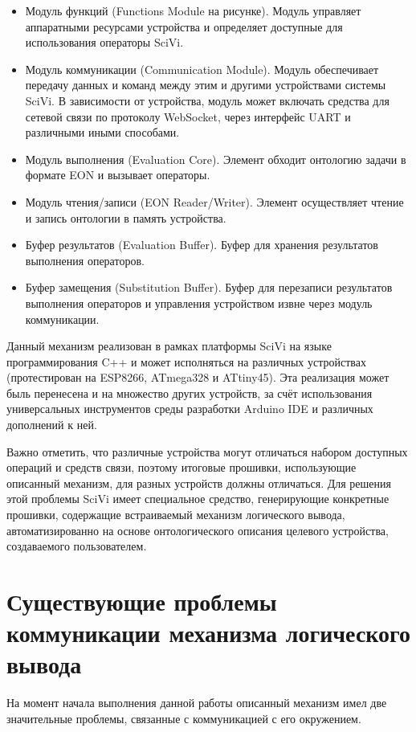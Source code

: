 \begin{itemize}
	\item Модуль функций (Functions Module на рисунке). Модуль управляет аппаратными ресурсами устройства и определяет доступные для использования операторы SciVi.
	\item Модуль коммуникации (Communication Module). Модуль обеспечивает передачу данных и команд между этим и другими устройствами системы SciVi.
	В зависимости от устройства, модуль может включать средства для сетевой связи по протоколу WebSocket, через интерфейс UART и различными иными способами.
	\item Модуль выполнения (Evaluation Core). Элемент обходит онтологию задачи в формате EON и вызывает операторы.
	\item Модуль чтения/записи (EON Reader/Writer). Элемент осуществляет чтение и запись онтологии в память устройства.
	\item Буфер результатов (Evaluation Buffer). Буфер для хранения результатов выполнения операторов.
	\item Буфер замещения (Substitution Buffer). Буфер для перезаписи результатов выполнения операторов и управления устройством извне через модуль коммуникации.
\end{itemize}

Данный механизм реализован в рамках платформы SciVi на языке программирования C++ и может исполняться на различных устройствах (протестирован на ESP8266, ATmega328 и ATtiny45).
Эта реализация может быль перенесена и на множество других устройств, за счёт использования универсальных инструментов среды разработки Arduino IDE и различных дополнений к ней.

Важно отметить, что различные устройства могут отличаться набором доступных операций и средств связи, поэтому итоговые прошивки, использующие описанный механизм, для разных устройств должны отличаться.
Для решения этой проблемы SciVi имеет специальное средство, генерирующие конкретные прошивки, содержащие встраиваемый механизм логического вывода, автоматизированно на основе онтологического описания целевого устройства, создаваемого пользователем.

\section{Существующие проблемы коммуникации механизма логического вывода}

На момент начала выполнения данной работы описанный механизм имел две значительные проблемы, связанные с коммуникацией с его окружением.

